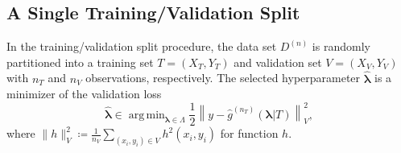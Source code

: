 \documentclass[12pt]{article} %
\theoremstyle{definition}
\DeclareMathOperator*{\argmin}{arg\,min}
\begin{document}
\subsection{A Single Training/Validation Split}\label{sec:single}

In the training/validation split procedure, the data set $D^{(n)}$ is randomly partitioned into a training set $T = (X_T, Y_T)$ and validation set $V = (X_V, Y_V)$ with $n_T$ and $n_V$ observations, respectively.
The selected hyperparameter $\hat{\boldsymbol{\lambda}}$ is a minimizer of the validation loss
\begin{equation}
\label{eq:train_val_lambda}
\hat{\boldsymbol \lambda} \in \argmin_{\boldsymbol{\lambda} \in\Lambda} \frac{1}{2} \left \| y-\hat{g}^{(n_T)}( \boldsymbol \lambda | T) \right \|_{V}^{2},
\end{equation}
where $\| h \|^2_{V} \coloneqq \frac{1}{n_V}\sum_{(x_i, y_i)\in V} h^2(x_i, y_i)$ for function $h$.
\end{document}
